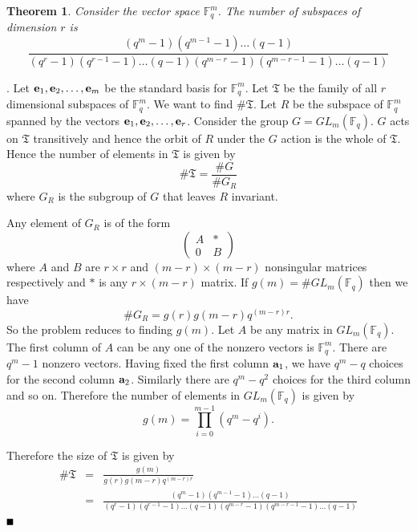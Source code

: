 \documentclass{Rinton-P9x6}
\newtheorem{theorem}{Theorem}[section]
\newcommand{\GF}[2][]{{\ensuremath{\mathbb{F}_{#2}^{#1}}}}
\newcommand{\GL}[2][2]{\ensuremath{GL_{#2}(\mathbb{F}_{#1})}}
\newcommand{\GLnq}{\GL[q]{m}}
\newcommand{\bproof}{\noindent{\it Proof}}
\newcommand{\eproof}{\hspace*{\fill}$\rule{2mm}{2mm}$~~~~~\bigskip}
\renewenvironment{proof}{\bproof. }{\eproof}
\renewcommand{\a}{{\bf a}}
\newcommand{\e}{{\bf e}}
\begin{document}
\begin{theorem} \label{gntheorem}
  Consider the vector space $\GF[m]{q}$. The number of subspaces of dimension
$r$ is
\[
\frac{(q^m - 1)(q^{m-1} -1 ) \ldots (q -1) } { (q^r -1)(q^{r-1} -1 )
  \ldots (q-1) ( q^{m-r} -1 ) (q^{m-r-1} -1 ) \ldots (q -1 ) }
\]
\end{theorem}
\begin{proof}
  Let $\e_1,\e_2,\ldots,\e_m$ be the standard basis for $\GF[m]{q}$.
  Let $\mathfrak{T}$ be the family of all $r$ dimensional subspaces of
  $\GF[m]{q}$.  We want to find $\# \mathfrak{T}$. Let $R$ be the
  subspace of $\GF[m]{q}$ spanned by the vectors
  $\e_1,\e_2,\ldots,\e_r$. Consider the group $G = \GLnq$. $G$ acts on
  $\mathfrak{T}$ transitively and hence the orbit of $R$ under the $G$
  action is the whole of $\mathfrak{T}$. Hence the number of elements in
  $\mathfrak{T}$ is given by
  \[
  \# \mathfrak{T} = \frac{\# G}{\# G_R}
  \]
  where $G_R$ is the subgroup of $G$ that leaves $R$ invariant.
  
  Any element of $G_R$ is of the form 
  \[
  \left(
    \begin{array}{c|c}
      A&*\\
      \hline
      0 & B
    \end{array}
  \right)
  \]
  where $A$ and $B$ are $r \times r $ and $(m-r) \times (m-r)$ nonsingular matrices respectively and
  $*$ is any $r \times ( m -r) $ matrix. If $g(m) = \# \GLnq$ then we have 
  \[
  \# G_R = g(r) g(m-r) q^{(m-r)r}.
  \]
  So the problem reduces to finding $g(m)$. Let $A$ be any matrix in
  $\GLnq$. The first column of $A$ can be any one of the nonzero
  vectors is $\GF[m]{q}$. There are $q^m -1$ nonzero vectors.  Having
  fixed the first column $\a_1$, we have $q^m - q$ choices for the
  second column $\a_2$. Similarly there are $q^m -q^2$ choices for the
  third column and so on. Therefore the number of elements in $\GLnq$
  is given by
\[
g(m) = \prod_{i=0}^{m-1} (q^m - q^i).
\]

Therefore the size of $\mathfrak{T}$ is given by
\begin{eqnarray}
  \nonumber
  \# \mathfrak{T} &=& \frac{g(m)}{g(r)g(m-r) q^{(m-r)r}}\\
    \nonumber
    &=& \frac{(q^m - 1)(q^{m-1} -1 ) \ldots (q -1) }
            { (q^r -1)(q^{r-1} -1 ) \ldots (q-1) ( q^{m-r} -1 ) (q^{m-r-1} -1 )
              \ldots (q -1 ) }  
\end{eqnarray}
\end{proof}
\end{document}
